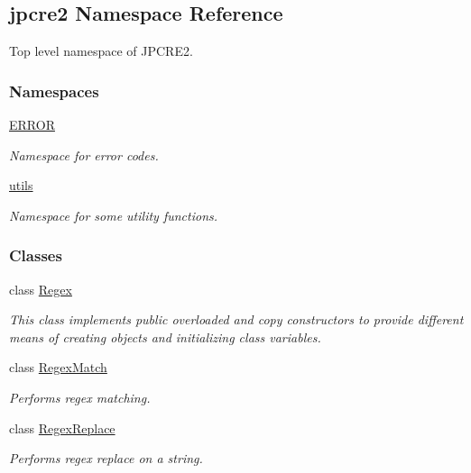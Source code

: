 \hypertarget{namespacejpcre2}{}\subsection{jpcre2 Namespace Reference}
\label{namespacejpcre2}


Top level namespace of J\+P\+C\+R\+E2.  


\subsubsection*{Namespaces}
\begin{DoxyCompactItemize}
\item 
 \hyperlink{namespacejpcre2_1_1ERROR}{E\+R\+R\+OR}
\begin{DoxyCompactList}\small\item\em Namespace for error codes. \end{DoxyCompactList}\item 
 \hyperlink{namespacejpcre2_1_1utils}{utils}
\begin{DoxyCompactList}\small\item\em Namespace for some utility functions. \end{DoxyCompactList}\end{DoxyCompactItemize}
\subsubsection*{Classes}
\begin{DoxyCompactItemize}
\item 
class \hyperlink{classjpcre2_1_1Regex}{Regex}
\begin{DoxyCompactList}\small\item\em This class implements public overloaded and copy constructors to provide different means of creating objects and initializing class variables. \end{DoxyCompactList}\item 
class \hyperlink{classjpcre2_1_1RegexMatch}{Regex\+Match}
\begin{DoxyCompactList}\small\item\em Performs regex matching. \end{DoxyCompactList}\item 
class \hyperlink{classjpcre2_1_1RegexReplace}{Regex\+Replace}
\begin{DoxyCompactList}\small\item\em Performs regex replace on a string. \end{DoxyCompactList}\end{DoxyCompactItemize}
